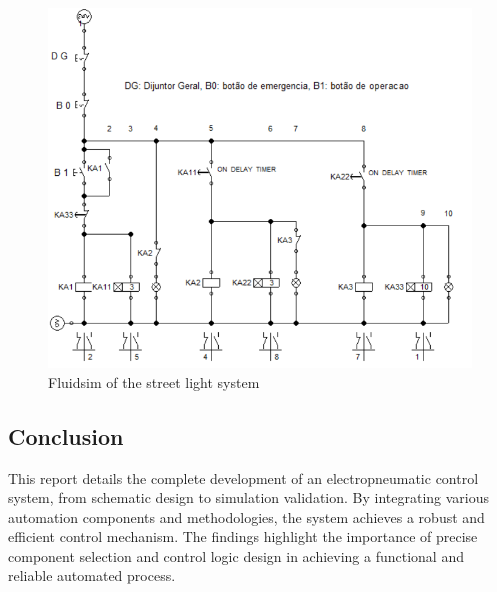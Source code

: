 \begin{figure}[H]
    \includegraphics[width=16cm]{Images/Q5/fluidsim.png}
    \centering
    \caption{Fluidsim of the street light system}
    \label{fig:fluidsim}
\end{figure}

\subsection{Conclusion}

This report details the complete development of an electropneumatic control system, from schematic 
design to simulation validation. By integrating various automation components and methodologies, 
the system achieves a robust and efficient control mechanism. The findings highlight the importance 
of precise component selection and control logic design in achieving a functional and reliable 
automated process.